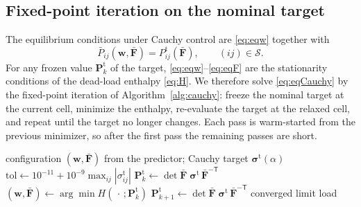\documentclass[11pt,a4paper]{article}
\newcommand{\Fb}{\bar{\mathbf F}}
\newcommand{\Pt}{\mathbf P^{\mathrm t}}
\newcommand{\sigt}{\bm\sigma^{\mathrm t}}
\newcommand{\w}{\mathbf w}
\begin{document}
\subsection{Fixed-point iteration on the nominal target}

The equilibrium conditions under Cauchy control are \eqref{eq:eqw} together with
\begin{equation}
  \bar P_{ij}(\w,\Fb)=P^{\mathrm t}_{ij}(\Fb),\qquad(ij)\in\mathcal S .
  \label{eq:eqCauchy}
\end{equation}
For any frozen value \(\Pt_k\) of the target, \eqref{eq:eqw}--\eqref{eq:eqF} are the stationarity
conditions of the dead-load enthalpy \eqref{eq:H}. We therefore solve \eqref{eq:eqCauchy} by the
fixed-point iteration of Algorithm~\ref{alg:cauchy}: freeze the nominal target at the current cell,
minimize the enthalpy, re-evaluate the target at the relaxed cell, and repeat until the target no
longer changes. Each pass is warm-started from the previous minimizer, so after the first pass the
remaining passes are short.

\begin{algorithm}[t]
\caption{Cauchy stress control of a periodic cell at load level \(\alpha\)}
\label{alg:cauchy}
\begin{algorithmic}[1]
\Require configuration \((\w,\Fb)\) from the predictor; Cauchy target \(\sigt(\alpha)\)
\State \(\mathrm{tol}\gets10^{-11}+10^{-9}\max_{ij}|\sigma^{\mathrm t}_{ij}|\)
  \State \(\Pt_k\gets\det\Fb\;\sigt\,\Fb^{-\mathsf T}\)
  \State \((\w,\Fb)\gets\arg\min H(\,\cdot\,;\Pt_k)\) 
  \State \(\Pt_{k+1}\gets\det\Fb\;\sigt\,\Fb^{-\mathsf T}\)
   \State \Return converged \EndIf
     \State \Return limit load 
  \EndIf
\EndFor
\end{algorithmic}
\end{algorithm}
\end{document}
